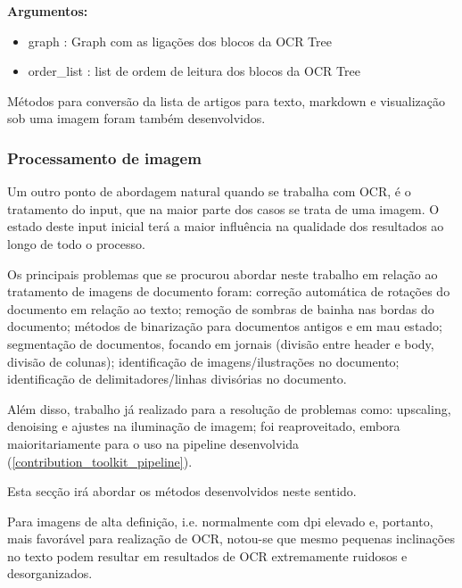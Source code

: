 \textbf{Argumentos:}
\begin{itemize}\setlength\itemsep{-0.3em}
	\item graph : Graph com as ligações dos blocos da OCR Tree
	\item order\_list : list de ordem de leitura dos blocos da OCR Tree
\end{itemize}



Métodos para conversão da lista de artigos para texto, markdown e visualização sob uma imagem foram também desenvolvidos.



\subsubsection{Processamento de imagem}
\label{contribution_image_processing}


Um outro ponto de abordagem natural quando se trabalha com OCR, é o tratamento do input, que na maior parte dos casos se trata de uma imagem. O estado deste input inicial terá a maior influência na qualidade dos resultados ao longo de todo o processo.

Os principais problemas que se procurou abordar neste trabalho em relação ao tratamento de imagens de documento foram: correção automática de rotações do documento em relação ao texto; remoção de sombras de bainha nas bordas do documento; métodos de binarização para documentos antigos e em mau estado; segmentação de documentos, focando em jornais (divisão entre header e body, divisão de colunas); identificação de imagens/ilustrações no documento; identificação de delimitadores/linhas divisórias no documento. 

Além disso, trabalho já realizado para a resolução de problemas como: upscaling, denoising e ajustes na iluminação de imagem; foi reaproveitado, embora maioritariamente para o uso na pipeline desenvolvida (\ref{contribution_toolkit_pipeline}).


Esta secção irá abordar os métodos desenvolvidos neste sentido.


\label{contribution_image_rotation_correction}

Para imagens de alta definição, i.e. normalmente com dpi elevado e, portanto, mais favorável para realização de OCR, notou-se que mesmo pequenas inclinações no texto podem resultar em resultados de OCR extremamente ruidosos e desorganizados.

